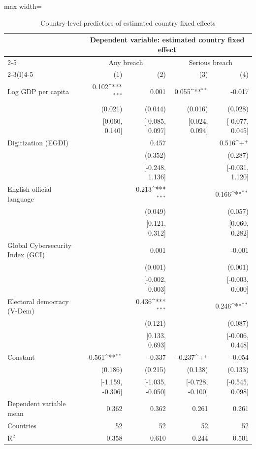 \begin{table}[!htbp]
\centering
\scriptsize
\def\sym#1{\ifmmode^{#1}\else\(^{#1}\)\fi}
\caption{Country-level predictors of estimated country fixed effects}
\label{tab:country_predictors}
\begin{adjustbox}{max width=\linewidth}
\begin{tabular}{lrrrr}
\toprule\toprule
& \multicolumn{4}{c}{Dependent variable: estimated country fixed effect} \\
\cmidrule(l){2-5}
& \multicolumn{2}{c}{Any breach} & \multicolumn{2}{c}{Serious breach} \\
\cmidrule(lr){2-3}\cmidrule(l){4-5}
& (1) & (2) & (3) & (4) \\
\midrule
Log GDP per capita & 0.102\sym{***} & 0.001 & 0.055\sym{**} & -0.017 \\
 & (0.021) & (0.044) & (0.016) & (0.028) \\
 & [0.060, 0.140] & [-0.085, 0.097] & [0.024, 0.094] & [-0.077, 0.045] \\
Digitization (EGDI) &  & 0.457 &  & 0.516\sym{+} \\
 &  & (0.352) &  & (0.287) \\
 &  & [-0.248, 1.136] &  & [-0.031, 1.120] \\
English official language &  & 0.213\sym{***} &  & 0.166\sym{**} \\
 &  & (0.049) &  & (0.057) \\
 &  & [0.121, 0.312] &  & [0.060, 0.282] \\
Global Cybersecurity Index (GCI) &  & 0.001 &  & -0.001 \\
 &  & (0.001) &  & (0.001) \\
 &  & [-0.002, 0.003] &  & [-0.003, 0.000] \\
Electoral democracy (V-Dem) &  & 0.436\sym{***} &  & 0.246\sym{**} \\
 &  & (0.121) &  & (0.087) \\
 &  & [0.133, 0.693] &  & [-0.006, 0.448] \\
Constant & -0.561\sym{**} & -0.337 & -0.237\sym{+} & -0.054 \\
 & (0.186) & (0.215) & (0.138) & (0.133) \\
 & [-1.159, -0.306] & [-1.035, -0.050] & [-0.728, -0.100] & [-0.545, 0.098] \\
\midrule
Dependent variable mean & 0.362 & 0.362 & 0.261 & 0.261 \\
Countries & 52 & 52 & 52 & 52 \\
R$^2$ & 0.358 & 0.610 & 0.244 & 0.501 \\

\end{tabular}
\end{adjustbox}
\end{table}
